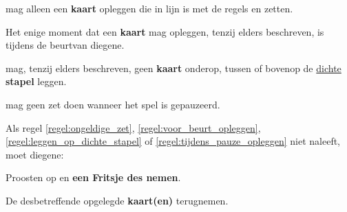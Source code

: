 

\newpage
{}


\vervolgLijst{}
\item \EenSpeler mag alleen een \textbf{kaart} opleggen die in lijn is met de regels en zetten.
\label{regel:ongeldige_zet}
\eindLijst{}

\vervolgLijst{}
\item Het enige moment dat \eenSpeler een \textbf{kaart} mag opleggen, tenzij elders beschreven, is tijdens de beurt\footnotemark[1] van diegene.
\label{regel:voor_beurt_opleggen}
\eindLijst{}

\vervolgLijst{}
\item \EenSpeler mag, tenzij elders beschreven, geen \textbf{kaart} onderop, tussen of bovenop de \ul{dichte} \textbf{stapel} leggen.
\label{regel:leggen_op_dichte_stapel}
\eindLijst{}

\vervolgLijst{}
\item \EenSpeler mag geen zet doen wanneer het spel is gepauzeerd\footnotemark[2].
\label{regel:tijdens_pauze_opleggen}
\eindLijst{}

\vervolgLijst{}
\item Als \eenSpeler regel \ref{regel:ongeldige_zet}, \ref{regel:voor_beurt_opleggen}, \ref{regel:leggen_op_dichte_stapel} of \ref{regel:tijdens_pauze_opleggen} niet naleeft, moet diegene:
\puntLijst{}
\item Proosten op  en \textbf{een Fritsje des nemen}\footnotemark[3].
\item De desbetreffende opgelegde \textbf{kaart(en)} terugnemen.
\eindPuntLijst{}
\label{regel:kaarten_terugnemen_2}
\eindLijst{}

